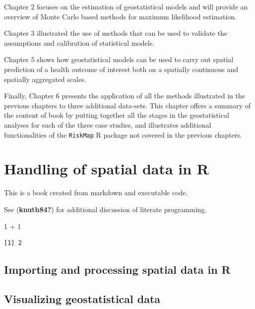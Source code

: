 \documentclass[
  letterpaper,
]{krantz}
\newenvironment{Shaded}{\begin{snugshade}}{\end{snugshade}}
\newcommand{\DecValTok}[1]{\textcolor[rgb]{0.68,0.00,0.00}{#1}}
\newcommand{\SpecialCharTok}[1]{\textcolor[rgb]{0.37,0.37,0.37}{#1}}
\begin{document}
Chapter 2 focuses on the estimation of geostatistical models and will
provide an overview of Monte Carlo based methods for maximum likelihood
estimation.

Chapter 3 illustrated the use of methods that can be used to validate
the assumptions and calibration of statistical models.

Chapter 5 shows how geostatistical models can be used to carry out
spatial prediction of a health outcome of interest both on a spatially
continuous and spatially aggregated scales.

Finally, Chapter 6 presents the application of all the methods
illustrated in the previous chapters to three additional data-sets. This
chapter offers a summary of the content of book by putting together all
the stages in the geostatistical analyses for each of the three case
studies, and illustrates additional functionalities of the
\texttt{RiskMap} R package not covered in the previous chapters.


\hypertarget{handling-of-spatial-data-in-r}{%
\chapter{Handling of spatial data in
R}\label{handling-of-spatial-data-in-r}}

This is a book created from markdown and executable code.

See (\textbf{knuth84?}) for additional discussion of literate
programming.

\begin{Shaded}
\begin{Highlighting}[]
\DecValTok{1} \SpecialCharTok{+} \DecValTok{1}
\end{Highlighting}
\end{Shaded}

\begin{verbatim}
[1] 2
\end{verbatim}

\hypertarget{importing-and-processing-spatial-data-in-r}{%
\section{Importing and processing spatial data in
R}\label{importing-and-processing-spatial-data-in-r}}

\hypertarget{visualizing-geostatistical-data}{%
\section{Visualizing geostatistical
data}\label{visualizing-geostatistical-data}}
\end{document}
